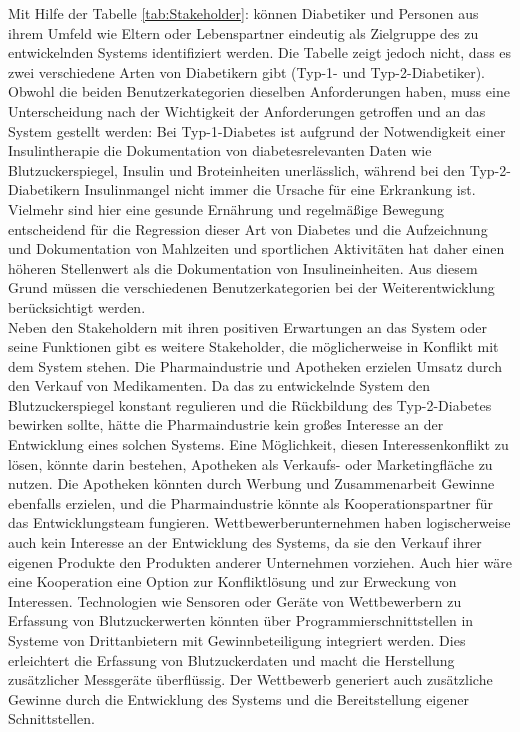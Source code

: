 	\setlength{\parindent}{0pt}Mit Hilfe der Tabelle \ref{tab:Stakeholder}:  können Diabetiker und Personen aus ihrem Umfeld wie Eltern oder Lebenspartner eindeutig als Zielgruppe des zu entwickelnden Systems identifiziert werden. Die Tabelle zeigt jedoch nicht, dass es zwei verschiedene Arten von Diabetikern gibt (Typ-1- und Typ-2-Diabetiker). Obwohl die beiden Benutzerkategorien dieselben Anforderungen haben, muss eine Unterscheidung nach der Wichtigkeit der Anforderungen getroffen und an das System gestellt werden: Bei Typ-1-Diabetes ist aufgrund der Notwendigkeit einer Insulintherapie die Dokumentation von diabetesrelevanten Daten wie Blutzuckerspiegel, Insulin und Broteinheiten unerlässlich, während bei den Typ-2-Diabetikern Insulinmangel nicht immer die Ursache für eine Erkrankung ist. Vielmehr sind hier eine gesunde Ernährung und regelmäßige Bewegung entscheidend für die Regression dieser Art von Diabetes und die Aufzeichnung und Dokumentation von Mahlzeiten und sportlichen Aktivitäten hat daher einen höheren Stellenwert als die Dokumentation von Insulineinheiten. Aus diesem Grund müssen die verschiedenen Benutzerkategorien bei der Weiterentwicklung berücksichtigt werden.\\
	Neben den Stakeholdern mit ihren positiven Erwartungen an das System oder seine Funktionen gibt es weitere Stakeholder, die möglicherweise in Konflikt mit dem System stehen. Die Pharmaindustrie und Apotheken erzielen Umsatz durch den Verkauf von Medikamenten. Da das zu entwickelnde System den Blutzuckerspiegel konstant regulieren und die Rückbildung des Typ-2-Diabetes bewirken sollte,  hätte die Pharmaindustrie kein großes Interesse an der Entwicklung eines solchen Systems.  Eine Möglichkeit, diesen Interessenkonflikt zu lösen, könnte darin bestehen, Apotheken als Verkaufs- oder Marketingfläche zu nutzen. Die Apotheken könnten durch Werbung und Zusammenarbeit Gewinne ebenfalls erzielen, und die Pharmaindustrie könnte als Kooperationspartner für das Entwicklungsteam fungieren. Wettbewerberunternehmen haben logischerweise auch kein Interesse an der Entwicklung des Systems, da sie den Verkauf ihrer eigenen Produkte den Produkten anderer Unternehmen vorziehen. Auch hier wäre eine Kooperation eine Option zur Konfliktlösung und zur Erweckung von Interessen. Technologien wie Sensoren oder Geräte von Wettbewerbern zu Erfassung von Blutzuckerwerten könnten  über Programmierschnittstellen in Systeme von Drittanbietern mit Gewinnbeteiligung integriert werden. Dies erleichtert die Erfassung von Blutzuckerdaten und macht die Herstellung zusätzlicher Messgeräte überflüssig. Der Wettbewerb generiert auch zusätzliche Gewinne durch die Entwicklung des Systems und die Bereitstellung eigener Schnittstellen.	
